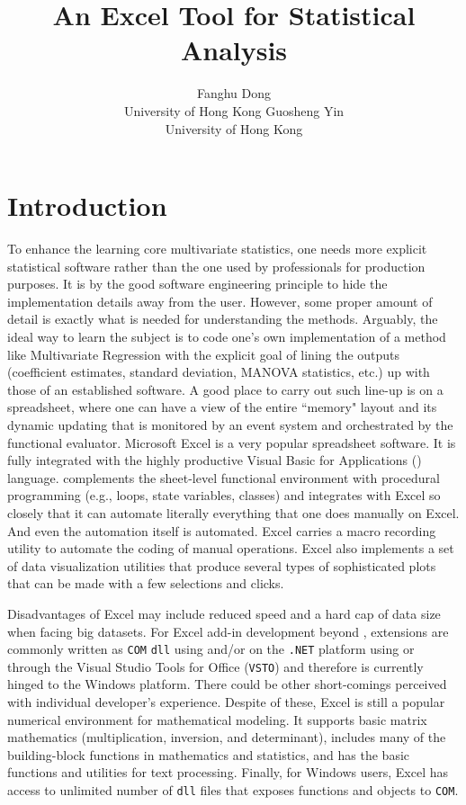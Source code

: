 \documentclass[article]{jss}
\author{Fanghu Dong\\University of Hong Kong \And Guosheng Yin\\University of Hong Kong}
\title{An Excel Tool for Statistical Analysis}
\begin{document}
  
  
  
  
  
    \section[intro]{Introduction}
        To enhance the learning core multivariate statistics, one needs more explicit statistical software rather than the one used by professionals for production purposes. It is by the good software engineering principle to hide the implementation details away from the user. However, some proper amount of detail is exactly what is needed for understanding the methods. Arguably, the ideal way to learn the subject is to code one's own implementation of a method like Multivariate Regression with the explicit goal of lining the outputs (coefficient estimates, standard deviation, MANOVA statistics, etc.) up with those of an established software. A good place to carry out such line-up is on a spreadsheet, where one can have a view of the entire ``memory" layout and its dynamic updating that is monitored by an event system and orchestrated by the functional evaluator. Microsoft Excel is a very popular spreadsheet software. It is fully integrated with the highly productive Visual Basic for Applications () language.  complements the sheet-level functional environment with procedural programming (e.g., loops, state variables, classes) and integrates with Excel so closely that it can automate literally everything that one does manually on Excel. And even the automation itself is automated. Excel carries a macro recording utility to automate the coding of manual operations. Excel also implements a set of data visualization utilities that produce several types of sophisticated plots that can be made with a few selections and clicks.
  
  
        Disadvantages of Excel may include reduced speed and a hard cap of data size when facing big datasets. For Excel add-in development beyond , extensions are commonly written as \texttt{COM} \texttt{dll} using   and/or on the \texttt{.NET} platform using  or  through the Visual Studio Tools for Office (\texttt{VSTO}) and therefore is currently hinged to the Windows platform. There could be other short-comings perceived with individual developer's experience. Despite of these, Excel is still a popular numerical environment for mathematical modeling. It supports basic matrix mathematics (multiplication, inversion, and determinant), includes many of the building-block functions in mathematics and statistics, and has the basic functions and utilities for text processing. Finally, for Windows users, Excel has access to unlimited number of \texttt{dll} files that exposes functions and objects to \texttt{COM}.
  
\end{document}
